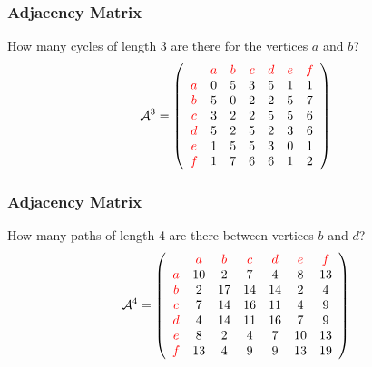 \documentclass{beamer}
\begin{document}
\begin{frame}
\frametitle{Adjacency Matrix}
\Large
How many cycles of length 3 are there for the vertices  $a$ and $b$?
\[
\mathcal{A}^3 = 
\left( 
\begin{array}{ccccccc}
&{\color{red}{a}}&{\color{red}{b}}
&{\color{red}{c}}&{\color{red}{d}}
&{\color{red}{e}}&{\color{red}{f}}
\\
{\color{red}{a}} & 0& 5 & 3 & 5 & 1 & 1\\
{\color{red}{b}} & 5& 0 & 2 & 2 & 5 & 7\\
{\color{red}{c}} & 3& 2 & 2 & 5 & 5 & 6\\
{\color{red}{d}} & 5& 2 & 5 & 2 & 3 & 6\\
{\color{red}{e}} & 1& 5 & 5 & 3 & 0 & 1\\
{\color{red}{f}} & 1& 7 & 6 & 6 & 1 & 2\\
\end{array}
\right)
\]
\end{frame}
\begin{frame}
\frametitle{Adjacency Matrix}
\Large
How many paths of length 4 are there between vertices $b$ and $d$?
\[
\mathcal{A}^4 = 
\left(
\begin{array}{ccccccc}
&{\color{red}{a}}&{\color{red}{b}}
&{\color{red}{c}}&{\color{red}{d}}
&{\color{red}{e}}&{\color{red}{f}}
\\
{\color{red}{a}} & 10 & 2 & 7& 4 & 8 & 13\\
{\color{red}{b}} & 2 & 17 & 14& 14 & 2& 4\\
{\color{red}{c}} & 7 & 14 & 16& 11& 4 & 9\\
{\color{red}{d}} & 4 & 14 & 11 & 16& 7 & 9\\
{\color{red}{e}} & 8 & 2 &  4 & 7 & 10& 13\\
{\color{red}{f}} & 13 & 4 & 9 & 9 & 13 & 19\\
\end{array}
\right)
\]
\end{frame}
\end{document}
